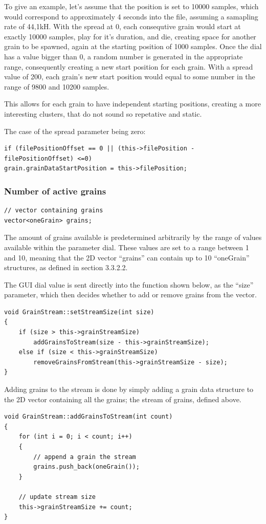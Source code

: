 To give an example, let's assume that the position is set to 10000
samples, which would correspond to approximately 4 seconds into the
file, assuming a samapling rate of 44,1kH. With the spread at 0, each
consequtive grain would start at exactly 10000 samples, play for it's
duration, and die, creating space for another grain to be spawned,
again at the starting position of 1000 samples. Once the dial has a
value bigger than 0, a random number is generated in the appropriate
range, consequently creating a new start position for each grain. With
a spread value of 200, each grain's new start position would equal to
some number in the range of 9800 and 10200 samples.

This allows for each grain to have independent starting positions,
creating a more interesting clusters, that do not sound so repetative
and static.

The case of the spread parameter being zero:
\begin{lstlisting}
if (filePositionOffset == 0 || (this->filePosition - filePositionOffset) <=0)
grain.grainDataStartPosition = this->filePosition;
\end{lstlisting}

\subsubsection{Number of active grains}
\begin{lstlisting}
// vector containing grains 
vector<oneGrain> grains;
\end{lstlisting}

The amount of grains available is predetermined arbitrarily by the
range of values available within the parameter dial. These values are
set to a range between 1 and 10, meaning that the 2D vector ``grains''
can contain up to 10 ``oneGrain'' structures, as defined in section 3.3.2.2. 

The GUI dial value is sent directly into the function shown below, as
the ``size'' parameter, which then decides whether to add or remove
grains from the vector.
\begin{lstlisting}
void GrainStream::setStreamSize(int size)
{
    if (size > this->grainStreamSize)
        addGrainsToStream(size - this->grainStreamSize);
    else if (size < this->grainStreamSize)
        removeGrainsFromStream(this->grainStreamSize - size);
}
\end{lstlisting}

Adding grains to the stream is done by simply adding a grain data
structure to the 2D vector containing all the grains; the stream of
grains, defined above.
\begin{lstlisting}
void GrainStream::addGrainsToStream(int count)
{
    for (int i = 0; i < count; i++)
    {
        // append a grain the stream
        grains.push_back(oneGrain());
    }
    
    // update stream size
    this->grainStreamSize += count;
}
\end{lstlisting}

